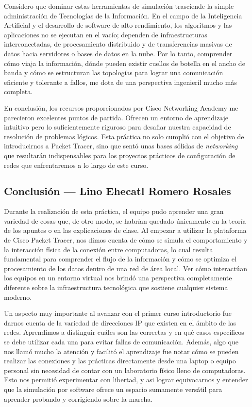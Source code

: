 Considero que dominar estas herramientas de simulación trasciende la simple administración de Tecnologías de la Información. En el campo de la Inteligencia Artificial y el desarrollo de software de alto rendimiento, los algoritmos y las aplicaciones no se ejecutan en el vacío; dependen de infraestructuras interconectadas, de procesamiento distribuido y de transferencias masivas de datos hacia servidores o bases de datos en la nube. Por lo tanto, comprender cómo viaja la información, dónde pueden existir cuellos de botella en el ancho de banda y cómo se estructuran las topologías para lograr una comunicación eficiente y tolerante a fallos, me dota de una perspectiva ingenieril mucho más completa.

En conclusión, los recursos proporcionados por Cisco Networking Academy me parecieron excelentes puntos de partida. Ofrecen un entorno de aprendizaje intuitivo pero lo suficientemente riguroso para desafiar nuestra capacidad de resolución de problemas lógicos. Esta práctica no solo cumplió con el objetivo de introducirnos a Packet Tracer, sino que sentó unas bases sólidas de \textit{networking} que resultarán indispensables para los proyectos prácticos de configuración de redes que enfrentaremos a lo largo de este curso.

\clearpage
\subsection{Conclusión — Lino Ehecatl Romero Rosales}
\label{sec:prac04:concl:lino}
Durante la realización de esta práctica, el equipo pudo aprender una gran variedad de cosas que, de otro modo, se habrían quedado únicamente en la teoría de los apuntes o en las explicaciones de clase. Al empezar a utilizar la plataforma de Cisco Packet Tracer, nos dimos cuenta de cómo se simula el comportamiento y la interacción física de la conexión entre computadoras, lo cual resulta fundamental para comprender el flujo de la información y cómo se optimiza el procesamiento de los datos dentro de una red de área local. Ver cómo interactúan los equipos en un entorno virtual nos brindó una perspectiva completamente diferente sobre la infraestructura tecnológica que sostiene cualquier sistema moderno.

Un aspecto muy importante al avanzar con el primer curso introductorio fue darnos cuenta de la variedad de direcciones IP que existen en el ámbito de las redes. Aprendimos a distinguir cuáles son las correctas y en qué casos específicos se debe utilizar cada una para evitar fallas de comunicación. Además, algo que nos llamó mucho la atención y facilitó el aprendizaje fue notar cómo se pueden realizar las conexiones y las prácticas directamente desde una laptop o equipo personal sin necesidad de contar con un laboratorio físico lleno de computadoras. Esto nos permitió experimentar con libertad, y asi lograr equivocarnos y entender que la simulación por software ofrece un espacio sumamente versátil para aprender probando y corrigiendo sobre la marcha.

